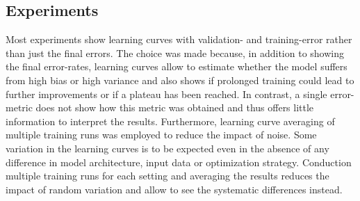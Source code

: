 
 
\subsection{Experiments}

Most experiments show learning curves with validation- and training-error rather than just the final errors. The choice was made because, in addition to showing the final error-rates, learning curves allow to estimate whether the model suffers from high bias or high variance and also shows if prolonged training could lead to further improvements or if a plateau has been reached. In contrast, a single error-metric does not show how this metric was obtained and thus offers little information to interpret the results. Furthermore, learning curve averaging of multiple training runs was employed to reduce the impact of noise. Some variation in the learning curves is to be expected even in the absence of any difference in model architecture, input data or optimization strategy. Conduction multiple training runs for each setting and averaging the results reduces the impact of random variation and allow to see the systematic differences instead.



